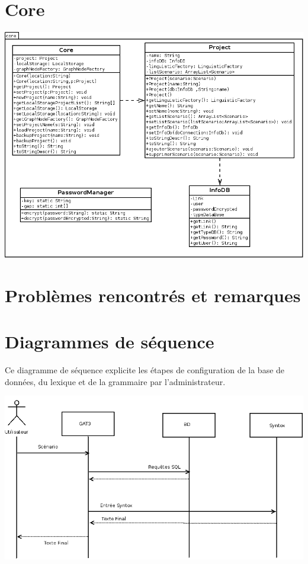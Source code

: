\documentclass[12pt]{report}
\begin{document}
\section{Core}


\begin{center}
\includegraphics[scale=0.5]{diversuml/Core.png}
\end{center}

\section{Problèmes rencontrés et remarques}

\section{Diagrammes de séquence}
	Ce diagramme de séquence explicite les étapes de configuration de la base de données, du lexique et de la grammaire par l'administrateur. 

	\includegraphics[scale=0.4]{diasequence2.png}
\end{document}

